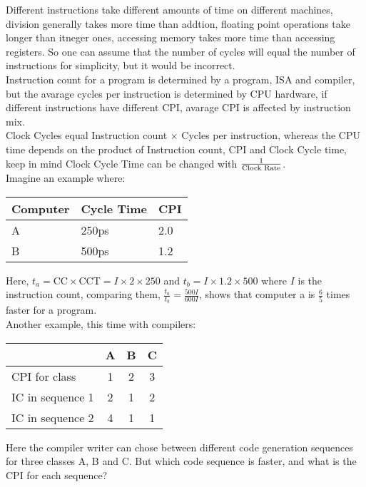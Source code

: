 \documentclass[11pt,a4paper,twocolumn]{book}
\begin{document}
Different instructions take different amounts of time on different machines, division generally takes more time than addtion, floating point operations take longer than itneger ones, accessing memory takes more time than accessing registers. So one can assume that the number of cycles will equal the number of instructions for simplicity, but it would be incorrect.\\

Instruction count for a program is determined by a program, ISA and compiler, but the avarage cycles per instruction is determined by CPU hardware, if different instructions have different CPI, avarage CPI is affected by instruction mix.\\

Clock Cycles equal Instruction count $\times$ Cycles per instruction, whereas the CPU time depends on the product of Instruction count, CPI and Clock Cycle time, keep in mind Clock Cycle Time can be changed with $\frac{1}{\text{Clock Rate}}$.\\

Imagine an example where:
\begin{table}[ht]
\begin{tabular}{lll}
Computer & Cycle Time & CPI\\
\toprule
A & 250ps & 2.0\\
B & 500ps & 1.2\\
\bottomrule
\end{tabular}
\end{table}

Here, $t_a = \text{CC} \times \text{CCT} = I \times 2 \times 250$ and $t_b = I \times 1.2 \times 500$ where $I$ is the instruction count, comparing them, $\frac{t_a}{t_b} = \frac{500I}{600I}$, shows that computer a is $\frac{6}{5}$ times faster for a program.\\

Another example, this time with compilers:

\begin{table}[ht]
\begin{tabular}{lccc}
 & A & B & C\\
\toprule
CPI for class & 1 & 2 & 3\\
IC in sequence 1 & 2 & 1 & 2\\
IC in sequence 2 & 4 & 1 & 1\\
\bottomrule
\end{tabular}
\end{table}

Here the compiler writer can chose between different code generation sequences for three classes A, B and C. But which code sequence is faster, and what is the CPI for each sequence?\\
\end{document}
